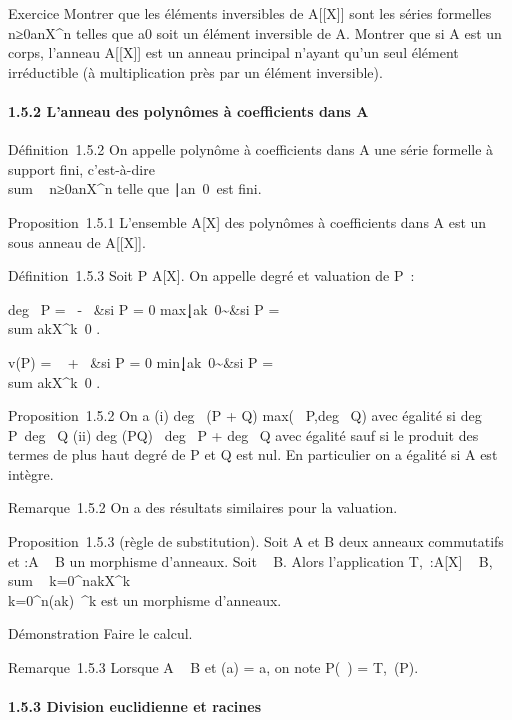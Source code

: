 Exercice Montrer que les éléments inversibles de A{[}{[}X{]}{]} sont les
séries formelles \\\sum
 n≥0anX^n telles que a0 soit
un élément inversible de A. Montrer que si A est un corps, l'anneau
A{[}{[}X{]}{]} est un anneau principal n'ayant qu'un seul élément
irréductible (à multiplication près par un élément inversible).

\paragraph{1.5.2 L'anneau des polynômes à coefficients dans A}

Définition~1.5.2 On appelle polynôme à coefficients dans A une série
formelle à support fini, c'est-à-dire
\\sum ~
n≥0anX^n telle que
\n∣an\mathrel\neq~0\
est fini.

Proposition~1.5.1 L'ensemble A{[}X{]} des polynômes à coefficients dans
A est un sous anneau de A{[}{[}X{]}{]}.

Définition~1.5.3 Soit P \in A{[}X{]}. On appelle degré et valuation de P~:

deg~ P = \left
\ \cases -\infty~ &si P = 0
\cr
max\k∣ak\mathrel\neq~0\~&si
P = \\sum
akX^k\neq~0 
\right .

v(P) = \left \ \cases
+\infty~ &si P = 0 \cr
min\k∣ak\mathrel\neq~0\~&si
P = \\sum
akX^k\neq~0 
\right .

Proposition~1.5.2 On a (i) deg~ (P + Q)
\leq max(\deg~
P,deg~ Q) avec égalité si
deg~
P\neq~deg~ Q (ii)
deg (PQ) \leq\ deg~ P
+ deg~ Q avec égalité sauf si le produit des
termes de plus haut degré de P et Q est nul. En particulier on a égalité
si A est intègre.

Remarque~1.5.2 On a des résultats similaires pour la valuation.

Proposition~1.5.3 (règle de substitution). Soit A et B deux anneaux
commutatifs et \phi:A \rightarrow~ B un morphisme d'anneaux. Soit \beta~ \in B. Alors
l'application T\phi,\beta~:A{[}X{]} \rightarrow~ B,
\\sum ~
k=0^nakX^k\mapsto~\\\sum
 k=0^n\phi(ak)\beta~^k est un morphisme
d'anneaux.

Démonstration Faire le calcul.

Remarque~1.5.3 Lorsque A \subset~ B et \phi(a) = a, on note P(\beta~) =
T\phi,\beta~(P).

\paragraph{1.5.3 Division euclidienne et racines}

